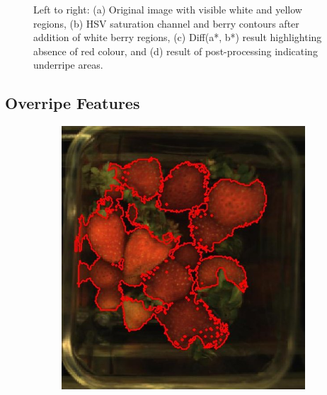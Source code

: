 \documentclass[fleqn,twoside,12pt]{report}
\begin{document}
\begin{figure}[ht]
	\caption{Left to right: (a) Original image with visible white and yellow regions, (b) HSV saturation channel and berry contours after addition of white berry regions, (c) Diff(a*, b*) result highlighting absence of red colour, and (d) result of post-processing indicating underripe areas.}
	\label{fig:underripe_process}
\end{figure}


\subsection{Overripe Features}

\begin{figure}[ht]
	\centering
	\begin{subfigure}{.30\textwidth}
		\centering
		\includegraphics[width=.9\linewidth]{over_berries.jpg}
		\caption{}
		\label{fig:over_berries}
	\end{subfigure}%
	\begin{subfigure}{.30\textwidth}
		\centering

\end{subfigure}
\end{figure}
\end{document}
